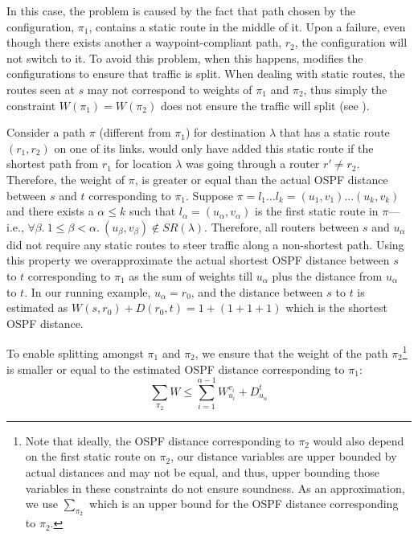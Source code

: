 In this case, the problem is caused by the fact that
path chosen by the configuration, $\pi_1$,
contains a static route in the middle of it.
Upon a failure, even though there exists another
a waypoint-compliant path, $r_2$, the configuration will not switch to it.
To avoid this problem, when this happens,
\name modifies the configurations to ensure that traffic is split.
When dealing with static routes,
the routes seen at $s$ may not 
correspond to weights of $\pi_1$ and $\pi_2$, 
thus simply 
the constraint $W(\pi_1) = W(\pi_2)$ does not ensure the 
traffic will split (see ).

Consider a path $\pi$ (different from $\pi_1$) for destination $\lambda$
that has  a  static route $(r_1, r_2)$ on one of its links.
\name would only have added this static route
if the shortest path from $r_1$ for location $\lambda$
was going through  a
router $r' \not= r_2$. 
Therefore, the weight of $\pi$,
 is greater or equal than the 
actual OSPF distance
between $s$ and $t$ corresponding to $\pi_1$. 
Suppose $\pi = l_1 \ldots l_k = (u_1, v_1) \ldots (u_k, v_k)$ 
and 
there exists a $\alpha \leq k$ such that 
$l_\alpha = (u_\alpha, v_\alpha)$  
is the first 
static route in $\pi$---i.e., 
$\forall \beta. ~1 \leq \beta < \alpha. ~(u_\beta, v_\beta) \not\in SR(\lambda)$.
Therefore, all routers between $s$ and $u_\alpha$ did
not require any static routes to steer traffic along a 
non-shortest path. 
Using this property we overapproximate
the
actual shortest OSPF distance  between $s$ to $t$ 
corresponding to $\pi_1$ 
as the sum of weights till $u_\alpha$ plus the distance
from $u_\alpha$ to $t$. In our running example, 
$u_\alpha = r_0$, and the distance between $s$ to $t$ 
is estimated as $W(s, r_0) + D(r_0, t) = 1 + (1 + 1 + 1)$
which is the shortest OSPF distance. 

To enable splitting amongst
$\pi_1$ and $\pi_2$, we ensure that the weight 
of the path $\pi_2$\footnote{
Note that ideally, the OSPF distance corresponding to 
$\pi_2$ would also depend on the first static route on
$\pi_2$, our distance variables are upper bounded by actual
distances and may not be equal, and thus, upper bounding 
those variables in these constraints do not ensure soundness.
As an approximation, we use $\sum_{\pi_2}$ which is an upper bound
for the OSPF distance corresponding to 
$\pi_2$. 
} 
is smaller or equal to 
the estimated OSPF distance corresponding to $\pi_1$: 
\begin{equation}
	\sum_{\pi_2} W \leq \sum_{i=1}^{\alpha - 1} W_{u_i}^{v_i} + D_{u_\alpha}^t	
\end{equation}

